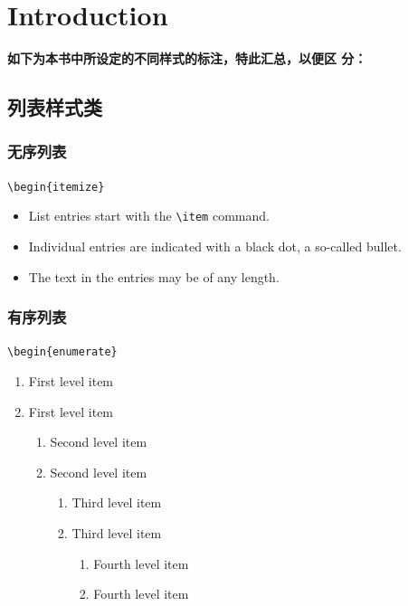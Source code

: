 \chapter{Introduction}
\label{cp:introduction}

\textbf{如下为本书中所设定的不同样式的标注，特此汇总，以便区
分：}

\section{列表样式类}
\subsection{无序列表}
\verb|\begin{itemize}|
\begin{itemize}
  \item List entries start with the \verb|\item| command.
  \item Individual entries are indicated with a black dot, a so-called bullet.
  \item The text in the entries may be of any length.
\end{itemize}

\subsection{有序列表}
\verb|\begin{enumerate}|
\begin{enumerate}%
    \item First level item
    \item First level item
    \begin{enumerate}%
        \item Second level item
        \item Second level item
            \begin{enumerate}%
                \item Third level item
                \item Third level item
                    \begin{enumerate}%
                        \item Fourth level item
                        \item Fourth level item
                    \end{enumerate}
            \end{enumerate}
    \end{enumerate}
\end{enumerate}


